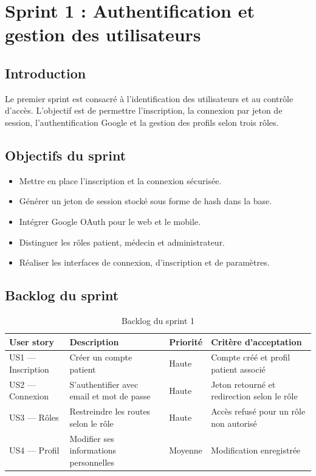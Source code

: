 \chapter{Sprint 1 : Authentification et gestion des utilisateurs}\label{chap4}

\section{Introduction}

Le premier sprint est consacré à l'identification des utilisateurs et au contrôle d'accès. L'objectif est de permettre l'inscription, la connexion par jeton de session, l'authentification Google et la gestion des profils selon trois rôles.

\section{Objectifs du sprint}

\begin{itemize}
    \item Mettre en place l'inscription et la connexion sécurisée.
    \item Générer un jeton de session stocké sous forme de hash dans la base.
    \item Intégrer Google OAuth pour le web et le mobile.
    \item Distinguer les rôles patient, médecin et administrateur.
    \item Réaliser les interfaces de connexion, d'inscription et de paramètres.
\end{itemize}

\section{Backlog du sprint}

\begin{table}[H]
\centering
\begin{tabular}{|p{3cm}|p{6cm}|p{2cm}|p{3cm}|}
\hline
\textbf{User story} & \textbf{Description} & \textbf{Priorité} & \textbf{Critère d'acceptation} \\
\hline
US1 --- Inscription & Créer un compte patient & Haute & Compte créé et profil patient associé \\
\hline
US2 --- Connexion & S'authentifier avec email et mot de passe & Haute & Jeton retourné et redirection selon le rôle \\
\hline
US3 --- Rôles & Restreindre les routes selon le rôle & Haute & Accès refusé pour un rôle non autorisé \\
\hline
US4 --- Profil & Modifier ses informations personnelles & Moyenne & Modification enregistrée \\
\hline
\end{tabular}
\caption{Backlog du sprint 1}
\end{table}

